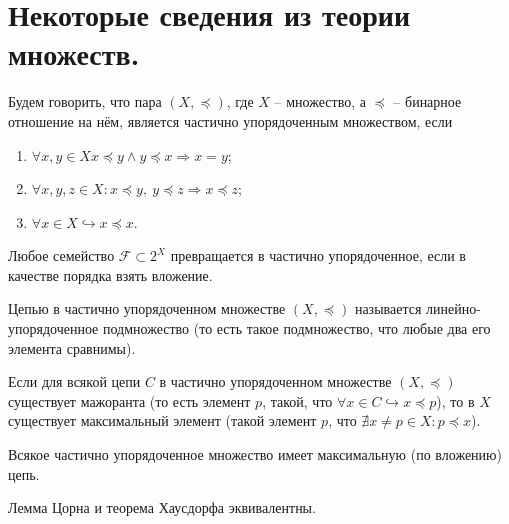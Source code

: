\section{Некоторые сведения из теории множеств.}
\begin{definition}
    Будем говорить, что пара $(X, \preceq)$, где $X$ -- множество, а $\preceq$ -- бинарное отношение на нём, является частично упорядоченным множеством, если
    \begin{enumerate}
        \item $\forall x, y \in X x \preceq y \wedge y \preceq x \Rightarrow x = y$;
        \item $\forall x, y, z \in X\colon x \preceq y, \ y \preceq z  \Rightarrow x \preceq z$;
        \item $\forall x \in X \hookrightarrow x \preceq x$.
    \end{enumerate}
\end{definition}
\begin{note}
    Любое семейство $\mathcal{F} \subset 2^X$ превращается в частично упорядоченное, если в качестве порядка взять вложение.
\end{note}
\begin{definition}
    Цепью в частично упорядоченном множестве $(X, \preceq)$ называется линейно-упорядоченное подмножество (то есть такое подмножество, что любые два его элемента сравнимы).
\end{definition}
\begin{lemma}[Цорн]
    Если для всякой цепи $C$ в частично упорядоченном множестве $(X, \preceq)$ существует мажоранта (то есть элемент $p$, такой, что $\forall x \in C \hookrightarrow x \preceq p$), то в $X$ существует максимальный элемент (такой элемент $p$, что $\nexists x \neq p \in X\colon p \preceq x$).
\end{lemma}
\begin{theorem}[Хаусдорф]
    Всякое частично упорядоченное множество имеет максимальную (по вложению) цепь.
\end{theorem}
\begin{proposition}
    Лемма Цорна и теорема Хаусдорфа эквивалентны.
\end{proposition}
